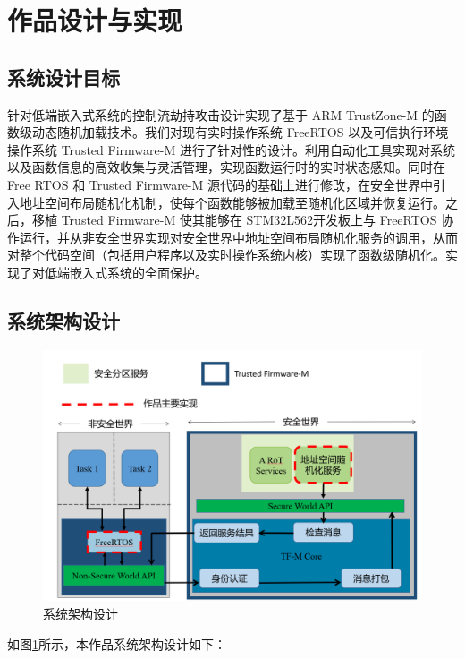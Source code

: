 \documentclass[UTF8,12pt,a4paper]{ctexart}
\numberwithin{figure}{section}
\begin{document}
\section{作品设计与实现}
\subsection{系统设计目标}
\par 针对低端嵌入式系统的控制流劫持攻击设计实现了基于 ARM TrustZone-M 的函数级动态随机加载技术。我们对现有实时操作系统 FreeRTOS 以及可信执行环境操作系统 Trusted Firmware-M 进行了针对性的设计。利用自动化工具实现对系统以及函数信息的高效收集与灵活管理，实现函数运行时的实时状态感知。同时在 Free RTOS 和 Trusted Firmware-M 源代码的基础上进行修改，在安全世界中引入地址空间布局随机化机制，使每个函数能够被加载至随机化区域并恢复运行。之后，移植 Trusted Firmware-M 使其能够在 STM32L562开发板上与 FreeRTOS 协作运行，并从非安全世界实现对安全世界中地址空间布局随机化服务的调用，从而对整个代码空间（包括用户程序以及实时操作系统内核）实现了函数级随机化。实现了对低端嵌入式系统的全面保护。
\subsection{系统架构设计}
\begin{figure}[H]
    \centering
    \includegraphics[scale=0.3]{graph/arc.png}
    \caption{系统架构设计}
    \label{fig:system_architecture}
\end{figure}
\par 如图\ref{fig:system_architecture}所示，本作品系统架构设计如下：
\end{document}

